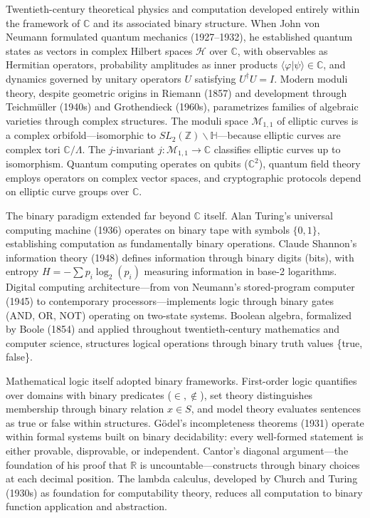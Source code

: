 Twentieth-century theoretical physics and computation developed entirely within the framework of $\mathbb{C}$ and its associated binary structure. When John von Neumann formulated quantum mechanics (1927–1932), he established quantum states as vectors in complex Hilbert spaces $\mathcal{H}$ over $\mathbb{C}$, with observables as Hermitian operators, probability amplitudes as inner products $\langle\varphi|\psi\rangle \in \mathbb{C}$, and dynamics governed by unitary operators $U$ satisfying $U^\dagger U = I$. Modern moduli theory, despite geometric origins in Riemann (1857) and development through Teichmüller (1940s) and Grothendieck (1960s), parametrizes families of algebraic varieties through complex structures. The moduli space $\mathcal{M}_{1,1}$ of elliptic curves is a complex orbifold—isomorphic to $SL_2(\mathbb{Z})\backslash\mathbb{H}$—because elliptic curves are complex tori $\mathbb{C}/\Lambda$. The $j$-invariant $j: \mathcal{M}_{1,1} \to \mathbb{C}$ classifies elliptic curves up to isomorphism. Quantum computing operates on qubits ($\mathbb{C}^2$), quantum field theory employs operators on complex vector spaces, and cryptographic protocols depend on elliptic curve groups over $\mathbb{C}$.

The binary paradigm extended far beyond $\mathbb{C}$ itself. Alan Turing's universal computing machine (1936) operates on binary tape with symbols $\{0,1\}$, establishing computation as fundamentally binary operations. Claude Shannon's information theory (1948) defines information through binary digits (bits), with entropy $H = -\sum p_i \log_2(p_i)$ measuring information in base-2 logarithms. Digital computing architecture—from von Neumann's stored-program computer (1945) to contemporary processors—implements logic through binary gates (AND, OR, NOT) operating on two-state systems. Boolean algebra, formalized by Boole (1854) and applied throughout twentieth-century mathematics and computer science, structures logical operations through binary truth values \{true, false\}.

Mathematical logic itself adopted binary frameworks. First-order logic quantifies over domains with binary predicates ($\in, \notin$), set theory distinguishes membership through binary relation $x \in S$, and model theory evaluates sentences as true or false within structures. Gödel's incompleteness theorems (1931) operate within formal systems built on binary decidability: every well-formed statement is either provable, disprovable, or independent. Cantor's diagonal argument—the foundation of his proof that $\mathbb{R}$ is uncountable—constructs through binary choices at each decimal position. The lambda calculus, developed by Church and Turing (1930s) as foundation for computability theory, reduces all computation to binary function application and abstraction.

